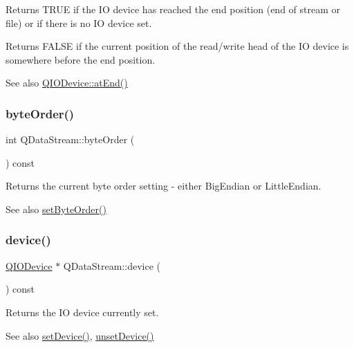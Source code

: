 Returns T\+R\+UE if the IO device has reached the end position (end of stream or file) or if there is no IO device set.

Returns F\+A\+L\+SE if the current position of the read/write head of the IO device is somewhere before the end position.

\begin{DoxySeeAlso}{See also}
\mbox{\hyperlink{class_q_i_o_device_ac5a3fcc9349a98d8f260039c5fd58812}{Q\+I\+O\+Device\+::at\+End()}} 
\end{DoxySeeAlso}
\mbox{\label{class_q_data_stream_afe9485a82d0e68105158cfac5ec095bf}} 
\subsubsection{\texorpdfstring{byteOrder()}{byteOrder()}}
{\footnotesize\ttfamily int Q\+Data\+Stream\+::byte\+Order (\begin{DoxyParamCaption}{ }\end{DoxyParamCaption}) const\hspace{0.3cm}{\ttfamily [inline]}}

Returns the current byte order setting -\/ either {\ttfamily Big\+Endian} or {\ttfamily Little\+Endian}.

\begin{DoxySeeAlso}{See also}
\mbox{\hyperlink{class_q_data_stream_af15532c2efeaca9f8818fca55a7d7d02}{set\+Byte\+Order()}} 
\end{DoxySeeAlso}
\mbox{\label{class_q_data_stream_adb4db2f7dc90c1eb08bcbe1707af2266}} 
\subsubsection{\texorpdfstring{device()}{device()}}
{\footnotesize\ttfamily \mbox{\hyperlink{class_q_i_o_device}{Q\+I\+O\+Device}} $\ast$ Q\+Data\+Stream\+::device (\begin{DoxyParamCaption}{ }\end{DoxyParamCaption}) const\hspace{0.3cm}{\ttfamily [inline]}}

Returns the IO device currently set. \begin{DoxySeeAlso}{See also}
\mbox{\hyperlink{class_q_data_stream_aa05d0c83cccfb3f193c365c6ee3bb323}{set\+Device()}}, \mbox{\hyperlink{class_q_data_stream_a00d9db572b7ce41ea1a8b321b024acbd}{unset\+Device()}} 
\end{DoxySeeAlso}
\mbox{\label{class_q_data_stream_a99e00dc6ee14658c30f58016f5f82e9e}} 
